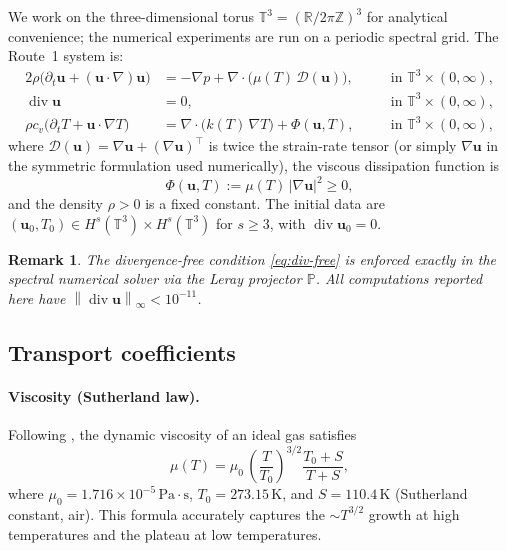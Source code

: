 \documentclass[12pt]{article}
\newtheorem{remark}[theorem]{Remark}
\newcommand{\R}{\mathbb{R}}
\newcommand{\T}{\mathbb{T}}
\newcommand{\Z}{\mathbb{Z}}
\newcommand{\norm}[1]{\left\|#1\right\|}
\newcommand{\abs}[1]{\left|#1\right|}
\newcommand{\Div}{\operatorname{div}}
\newcommand{\p}{\partial}
\newcommand{\grad}{\nabla}
\begin{document}
We work on the three-dimensional torus $\T^3 = (\R/2\pi\Z)^3$ for analytical
convenience; the numerical experiments are run on a periodic spectral grid.
The Route~1 system is:
\begin{alignat}{2}
  \label{eq:ns-full}
  \rho\bigl(\p_t\mathbf{u} + (\mathbf{u}\cdot\grad)\mathbf{u}\bigr)
    &= -\grad p + \grad\cdot\bigl(\mu(T)\,\mathcal{D}(\mathbf{u})\bigr),
    &\quad& \text{in } \T^3\times(0,\infty),\\
  \label{eq:div-free}
  \Div\mathbf{u} &= 0,
    &\quad& \text{in } \T^3\times(0,\infty),\\
  \label{eq:temp-full}
  \rho c_v\bigl(\p_t T + \mathbf{u}\cdot\grad T\bigr)
    &= \grad\cdot\bigl(k(T)\,\grad T\bigr) + \Phi(\mathbf{u},T),
    &\quad& \text{in } \T^3\times(0,\infty),
\end{alignat}
where $\mathcal{D}(\mathbf{u}) = \grad\mathbf{u} + (\grad\mathbf{u})^\top$ is twice the
strain-rate tensor (or simply $\grad\mathbf{u}$ in the symmetric formulation used
numerically), the viscous dissipation function is
\begin{equation}
  \label{eq:dissipation}
  \Phi(\mathbf{u},T) := \mu(T)\,\abs{\grad\mathbf{u}}^2 \geq 0,
\end{equation}
and the density $\rho > 0$ is a fixed constant.  The initial data are
$(\mathbf{u}_0, T_0) \in H^s(\T^3)\times H^s(\T^3)$ for $s \geq 3$, with
$\Div\mathbf{u}_0 = 0$.

\begin{remark}
  The divergence-free condition \eqref{eq:div-free} is enforced exactly in the
  spectral numerical solver via the Leray projector $\mathbb{P}$.  All
  computations reported here have $\norm{\Div\mathbf{u}}_\infty < 10^{-11}$.
\end{remark}

\subsection{Transport coefficients}
\label{ssec:transport}

\paragraph{Viscosity (Sutherland law).}
Following \citet{Sutherland1893}, the dynamic viscosity of an ideal gas satisfies
\begin{equation}
  \label{eq:sutherland}
  \mu(T) = \mu_0\,\left(\frac{T}{T_0}\right)^{3/2}
            \frac{T_0 + S}{T + S},
\end{equation}
where $\mu_0 = 1.716\times10^{-5}\,\mathrm{Pa}\cdot\mathrm{s}$,
$T_0 = 273.15\,\mathrm{K}$, and $S = 110.4\,\mathrm{K}$ (Sutherland constant,
air).  This formula accurately captures the $\sim T^{3/2}$ growth at high
temperatures and the plateau at low temperatures.
\end{document}
